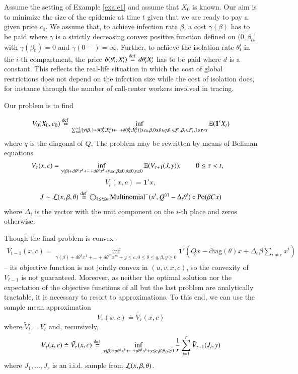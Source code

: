 \documentclass[english]{elsarticle}
\theoremstyle{plain}
\theoremstyle{remark}
\theoremstyle{plain}
\theoremstyle{definition}
\begin{document}
Assume the setting of Example \ref{exa:e1} and assume that $X_{0}$
is known. Our aim is to minimize the size of the epidemic at time
$t$ given that we are ready to pay a given price $c_{0}$. We assume
that, to achieve infection rate $\beta$, a cost $\gamma(\beta)$
has to be paid where $\gamma$ is a strictly decreasing convex positive
function defined on $(0,\beta_{0}]$ with $\gamma(\beta_{0})=0$ and
$\gamma(0-)=\infty$. Further, to achieve the isolation rate $\theta_{t}^{i}$
in the $i$-th compartment, the price $\delta(\theta_{t}^{i},X_{t}^{i})\stackrel{\text{def }}{=} d\theta_{t}^{i}X_{t}^{i}$
has to be paid where $d$ is a constant. This reflects the real-life
situation in which the cost of global restrictions does not depend
on the infection size while the cost of isolation does, for instance
through the number of call-center workers involved in tracing. 

Our problem is to find 

\[
V_{0}(X_{0},c_{0})\stackrel{\text{def }}{=}\inf_{\sum_{\tau=0}^{t-1}[\gamma(\beta_{\tau})+\delta(\theta_{t}^{k},X_{t}^{k})+\dots+\delta(\theta_{t}^{k},X_{t}^{k})]\leq c_{0},\beta,0\leq\theta\leq q,\theta_{\tau}\in\mathcal{F}_{\tau},\beta_{\tau}\in\mathcal{F}_{\tau},1\leq\tau<t}\mathbb{E}(\mathbf{1}'X_{t})
\]
where $q$ is the diagonal of $Q.$ The problem may be rewritten by
means of Bellman equations 
\begin{align*}
V_{\tau}(x,c) & =\inf_{\gamma(\beta)+d\theta^{k}x^{k}+\dots+d\theta^{k}x^{k}+y\leq c,\beta\geq0,\theta\geq0,y\geq0}\mathbb{E}(V_{\tau+1}(J,y)),\qquad0\leq\tau<t,
\end{align*}
\[
V_{t}(x,c)=\mathbf{1}'x,
\]
\[
J\sim\mathcal{L}(x,\beta,\theta)\stackrel{\text{def }}{=}\bigcirc_{1\leq i\leq m}\mathrm{Multinomial^{-}}(x^{i},Q^{(i)}-\Delta_{i}\theta^{i})\circ\mathrm{Po}(\beta Cx)
\]
where $\Delta_{i}$ is the vector with the unit component on the $i$-th
place and zeros otherwise.

Though the final problem is convex --
\begin{multline*}
V_{t-1}(x,c)=\inf_{\gamma(\beta)+d\theta^{1}x^{1}+\dots+d\theta^{m}x^{m}+y\leq c,0\leq\theta\leq q,\beta,y\geq0}\mathbf{1}'(Qx-\mathrm{diag}(\theta)x+\Delta_{e}\beta\sum_{i\neq e}x^{i})
\end{multline*}
-- its objective function is not jointly convex in $(u,v,x,c)$,
so the convexity of $V_{t-1}$ is not guaranteed. Moreover, as neither
the optimal solution nor the expectation of the objective functions
of all but the last problem are analytically tractable, it is necessary
to resort to approximations. To this end, we can use the sample mean
approximation 
\[
V_{\tau}(x,c)\doteq\tilde{V_{\tau}}(x,c)
\]
 where $\tilde{V}_{t}=V_{t}$ and, recursively,
\[
V_{\tau}(x,c)\doteq\tilde{V_{\tau}}(x,c)\stackrel{\text{def }}{=}\inf_{\gamma(\beta)+d\theta^{k}x^{k}+\dots+d\theta^{k}x^{k}+y\leq c,\beta,\theta,y\geq0}\frac{1}{r}\sum_{i=1}^{r}\tilde{V}_{\tau+1}(J_{i},y)
\]
where $J_{1},\dots,J_{r}$ is an i.i.d. sample from $\mathcal{L}(x,\beta,\theta)$.
\end{document}
